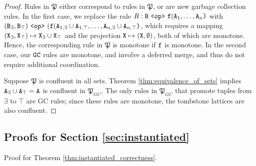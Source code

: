 \begin{proof}
Rules in $\mathfrak{P}$ either correspond to rules in $\mathfrak{P}$, or are new garbage collection rules.
In the first case, we replace the rule $R: \tt{B} ~\tt{<op>}~ \tt{f}(\tt{A}_1,\dots,\tt{A}_n\tt{)}$ with $(\tt{B}_\exists, \tt{B}_\top) ~\tt{<op>}~ (\tt{f}(\tt{A}_{1,\exists} \cup \tt{A}_{1,\top}, \dots, \tt{A}_{n,\exists} \cup \tt{A}_{n,\top} \tt{)}$, which requires a mapping $(\tt{X}_\exists, \tt{X}_\top) \mapsto \tt{X}_\exists \cup \tt{X}_\top$ and the projection $\tt{X} \mapsto (\tt{X}, \emptyset)$, both of which are monotone.
Hence, the corresponding rule in $\mathfrak{P}$ is monotone if $\tt{f}$ is monotone.
In the second case, our $\tt{GC}$ rules are monotone, and involve a deferred merge, and thus do not require additional coordination.

Suppose $\mathfrak{P}$ is confluent in all sets.
Theorem \ref{thm:equivalence_of_sets} implies $\tt{A}_{\exists} \cup \tt{A}_\top = \tt{A}$ is confluent in $\mathfrak{P}_{GC}$.
The only rules in $\mathfrak{P}_{GC}$ that promote tuples from $\exists$ to $\top$ are GC rules; since these rules are monotone, the tombstone lattices are also confluent.
\end{proof}


\subsection{Proofs for Section \ref{sec:instantiated}}

Proof for Theorem \ref{thm:instantiated_correctness}.

